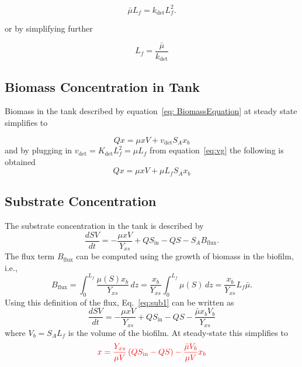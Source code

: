 \documentclass[letterpaper, twoside]{article}
\numberwithin{equation}{section}
\newcommand{\ie}{i.e.}
\begin{document}
\begin{equation*}
   {\bar\mu L_f}={k_{\mathrm{det}}L_f^2}.
\end{equation*}
 
 or by simplifying further
 
 \begin{equation}
  \label{eq:Lfsteady}
  {L_f}=\frac{\bar\mu}{k_{\mathrm{det}}}
\end{equation}

\subsection{Biomass Concentration in Tank}
Biomass in the tank described by equation~\ref{eq: BiomassEquation} at steady state simplifies to 

\begin{equation*} 
  Qx = \mu xV +v_{\mathrm{det}} S_A x_b
\end{equation*}
and by plugging in $v_{\mathrm{det}}= K_\mathrm{det} L_f^2 = \mu L_f$ from equation~\ref{eq:vg} the following is obtained
\begin{equation}
  Qx = \mu xV +\mu L_f S_A x_b
\end{equation}

\subsection{Substrate Concentration}
The substrate concentration in the tank is described by
\begin{equation}\label{eq:sub1}
  \frac{dS V}{dt} = -\frac{\mu x V}{Y_{xs}} + Q S_{\mathrm{in}} - Q S - S_A B_{\mathrm{flux}}.
\end{equation}
The flux term $B_\mathrm{flux}$ can be computed using the growth of biomass in the biofilm, \ie,
\begin{equation}
  B_\mathrm{flux} = \int_0^{L_f} \frac{\mu(S) x_b}{Y_{xs}} \, dz = \frac{ x_b}{Y_{xs}}\int_0^{L_f} \mu(S) \, dz = \frac{ x_b}{Y_{xs}} L_f \bar{\mu}.
\end{equation}
 Using this definition of the flux, Eq.~\ref{eq:sub1} can be written as
\begin{equation}
  \frac{dS V}{dt} = -\frac{\mu x V}{Y_{xs}} + Q S_{\mathrm{in}} - Q S -\frac{\bar{\mu} x_b V_b}{Y_{xs}}
\end{equation}
where $V_b=S_A L_f$ is the volume of the biofilm.   At steady-state this simplifies to 
\begin{equation}
 {\color{red}
   x = \frac{Y_{xs}}{\mu V}\left(Q S_{\mathrm{in}} - Q S\right) -\frac{\bar{\mu} V_b}{\mu V}x_b}
\end{equation}
\end{document}
